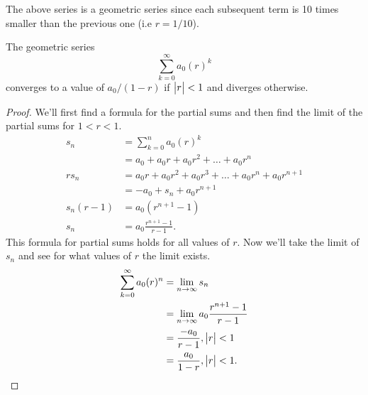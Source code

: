 The above series is a geometric series since each subsequent term is 10 times smaller than the previous one (i.e $r=1/10$).
\begin{lemma}
	The geometric series
	\begin{equation*}
		\sum_{k=0}^{\infty}{a_0(r)^k}
	\end{equation*}
	converges to a value of $a_0/(1-r)$ if $\big\lvert r \big\rvert < 1$ and diverges otherwise.
\end{lemma}
\begin{proof}
	We'll first find a formula for the partial sums and then find the limit of the partial sums for $1 < r < 1$.
	\begin{align*}
		s_n &= \sum_{k=0}^{n}{a_0(r)^k} \\
		&= a_0 + a_0r + a_0r^2 + \ldots + a_0r^n \\
		rs_n &= a_0r + a_0r^2 + a_0r^3 + \ldots + a_0r^n + a_0r^{n+1} \\
		&= -a_0 + s_n + a_0r^{n+1} \\
		s_n(r-1) &= a_0\left(r^{n+1} - 1\right) \\
		s_n &= a_0\frac{r^{n+1}-1}{r-1}.
	\end{align*}
	This formula for partial sums holds for all values of $r$.
	Now we'll take the limit of $s_n$ and see for what values of $r$ the limit exists.
	\begin{align*}
		\sum_{k=0}^{\infty}{a_0(r)^n} &= \lim_{n\to\infty}{s_n} \\
		&= \lim_{n\to\infty}{a_0\frac{r^{n+1}-1}{r-1}} \\
		&= \frac{-a_0}{r-1}, \big\lvert r \big\rvert < 1 \\
		&= \frac{a_0}{1-r}, \big\lvert r \big\rvert < 1.
	\end{align*}
\end{proof}

